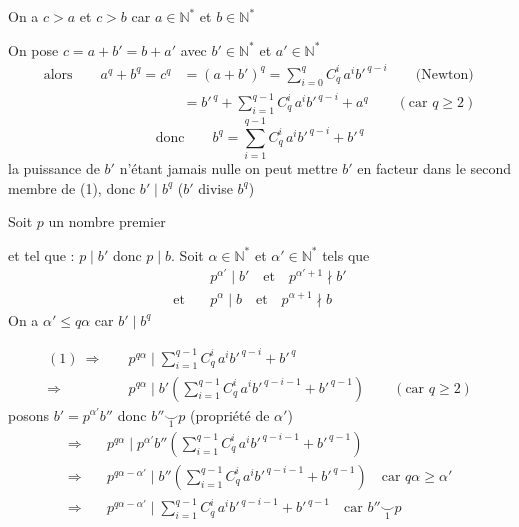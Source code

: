 On a $c>a$ et $c>b$ car $a\in\mathbb N^*$ et $b\in\mathbb N^*$

On pose $c=a+b'=b+a'$ avec $b'\in\mathbb N^*$ et $a'\in\mathbb N^*$
\[
\begin{aligned}
\text{alors}\qquad a^q+b^q=c^q&=(a+b')^q=\sum_{i=0}^{q}C_q^i\,a^i b'^{\,q-i}\qquad\text{(Newton)}\\
 &=b'^{\,q}+\sum_{i=1}^{q-1}C_q^i\,a^i b'^{\,q-i}+a^q\qquad(\text{car }q\geqslant2)
\end{aligned}
\]
\[
\text{donc}\qquad b^q=\sum_{i=1}^{q-1}C_q^i\,a^i b'^{\,q-i}+b'^{\,q}\tag*{(1)}
\]
la puissance de $b'$ n'étant jamais nulle on peut mettre $b'$ en facteur dans le second membre de (1), donc $b'\mid b^q$ ($b'$ divise $b^q$)

Soit $p$ un nombre premier %
 et tel que : $p\mid b'$ donc $p\mid b$. Soit $\alpha\in\mathbb N^*$ et $\alpha'\in\mathbb N^*$ tels que
\[
\begin{aligned}
 &p^{\alpha'}\mid b'\quad\text{et}\quad p^{\alpha'+1}\nmid b'\\
 \text{et}\quad &p^\alpha\mid b\quad\text{et}\quad p^{\alpha+1}\nmid b
\end{aligned}
\]
On a $\alpha'\leqslant q\alpha$ car $b'\mid b^q$

\[
\begin{aligned}
(1)\ \Longrightarrow\quad&p^{q\alpha}\mid\sum_{i=1}^{q-1}C_q^i\,a^i b'^{\,q-i}+b'^{\,q}\\
\Longrightarrow\quad&p^{q\alpha}\mid b'\left(\sum_{i=1}^{q-1}C_q^i\,a^i b'^{\,q-i-1}+b'^{\,q-1}\right)\qquad(\text{car }q\geqslant2)
\end{aligned}
\]
posons $b'=p^{\alpha'}b''$ donc $b''\mathrel{\underset{1}{\smile}}p$ (propriété de $\alpha'$)
\[
\begin{aligned}
\Longrightarrow\quad&p^{q\alpha}\mid p^{\alpha'}b''\left(\sum_{i=1}^{q-1}C_q^i\,a^i b'^{\,q-i-1}+b'^{\,q-1}\right)\\
\Longrightarrow\quad&p^{q\alpha-\alpha'}\mid b''\left(\sum_{i=1}^{q-1}C_q^i\,a^i b'^{\,q-i-1}+b'^{\,q-1}\right)\quad\text{car }q\alpha\geqslant\alpha'\\
\Longrightarrow\quad&p^{q\alpha-\alpha'}\mid\sum_{i=1}^{q-1}C_q^i\,a^i b'^{\,q-i-1}+b'^{\,q-1}\quad\text{car }b''\mathrel{\underset{1}{\smile}}p
\end{aligned}
\]

